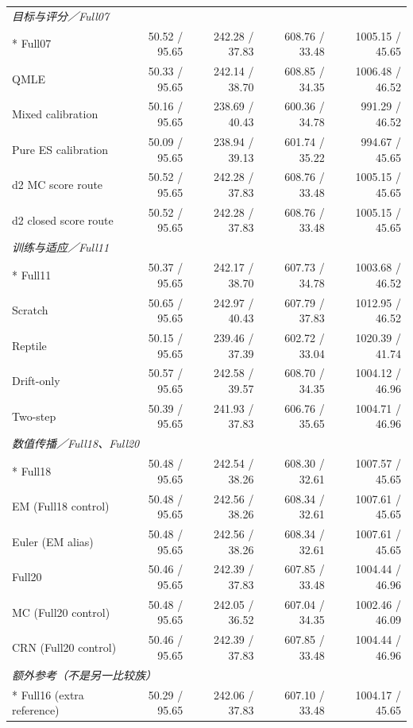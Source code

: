 \begin{longtable}{@{}p{.25\linewidth}rrrr@{}}
\multicolumn{5}{l}{\textit{目标与评分／Full07}}\\*
Full07 & 50.52 / 95.65 & 242.28 / 37.83 & 608.76 / 33.48 & 1005.15 / 45.65\\
QMLE & 50.33 / 95.65 & 242.14 / 38.70 & 608.85 / 34.35 & 1006.48 / 46.52\\
Mixed calibration & 50.16 / 95.65 & 238.69 / 40.43 & 600.36 / 34.78 & 991.29 / 46.52\\
Pure ES calibration & 50.09 / 95.65 & 238.94 / 39.13 & 601.74 / 35.22 & 994.67 / 45.65\\
d2 MC score route & 50.52 / 95.65 & 242.28 / 37.83 & 608.76 / 33.48 & 1005.15 / 45.65\\
d2 closed score route & 50.52 / 95.65 & 242.28 / 37.83 & 608.76 / 33.48 & 1005.15 / 45.65\\
\multicolumn{5}{l}{\textit{训练与适应／Full11}}\\*
Full11 & 50.37 / 95.65 & 242.17 / 38.70 & 607.73 / 34.78 & 1003.68 / 46.52\\
Scratch & 50.65 / 95.65 & 242.97 / 40.43 & 607.79 / 37.83 & 1012.95 / 46.52\\
Reptile & 50.15 / 95.65 & 239.46 / 37.39 & 602.72 / 33.04 & 1020.39 / 41.74\\
Drift-only & 50.57 / 95.65 & 242.58 / 39.57 & 608.70 / 34.35 & 1004.12 / 46.96\\
Two-step & 50.39 / 95.65 & 241.93 / 37.83 & 606.76 / 35.65 & 1004.71 / 46.96\\
\multicolumn{5}{l}{\textit{数值传播／Full18、Full20}}\\*
Full18 & 50.48 / 95.65 & 242.54 / 38.26 & 608.30 / 32.61 & 1007.57 / 45.65\\
EM (Full18 control) & 50.48 / 95.65 & 242.56 / 38.26 & 608.34 / 32.61 & 1007.61 / 45.65\\
Euler (EM alias) & 50.48 / 95.65 & 242.56 / 38.26 & 608.34 / 32.61 & 1007.61 / 45.65\\
Full20 & 50.46 / 95.65 & 242.39 / 37.83 & 607.85 / 33.48 & 1004.44 / 46.96\\
MC (Full20 control) & 50.48 / 95.65 & 242.05 / 36.52 & 607.04 / 34.35 & 1002.46 / 46.09\\
CRN (Full20 control) & 50.46 / 95.65 & 242.39 / 37.83 & 607.85 / 33.48 & 1004.44 / 46.96\\
\multicolumn{5}{l}{\textit{额外参考（不是另一比较族）}}\\*
Full16 (extra reference) & 50.29 / 95.65 & 242.06 / 37.83 & 607.10 / 33.48 & 1004.17 / 45.65\\
\end{longtable}
\endgroup
